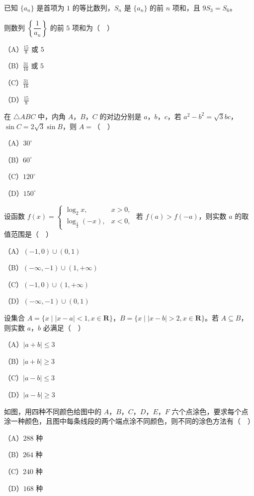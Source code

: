 \begin{question}
已知 $\{a_n\}$ 是首项为 $1$ 的等比数列，$S_n$ 是 $\{a_n\}$ 的前 $n$ 项和，且 $9S_3=S_6$。

则数列 $\left\{\dfrac1{a_n}\right\}$ 的前 $5$ 项和为（　）

（A）$\frac{15}8$ 或 $5$

（B）$\frac{31}{16}$ 或 $5$

（C）$\frac{31}{16}$

（D）$\frac{15}8$

\end{question}
\begin{question}
在 $\triangle ABC$ 中，内角 $A$，$B$，$C$ 的对边分别是 $a$，$b$，$c$，若 $a^2-b^2=\sqrt3bc$，$\sin C=2\sqrt3\sin B$，则 $A=$（　）

（A）$30^\circ$

（B）$60^\circ$

（C）$120^\circ$

（D）$150^\circ$

\end{question}
\begingroup
\renewenvironment{question}{\Needspace{0.5\textheight}}{}
\begin{question}
设函数 $f(x)=\begin{cases}\log_2x,&x>0,\\ \log_{\frac12}(-x),&x<0,\end{cases}$ 若 $f(a)>f(-a)$，则实数 $a$ 的取值范围是（　）

（A）$(-1,0)\cup(0,1)$

（B）$(-\infty,-1)\cup(1,+\infty)$

（C）$(-1,0)\cup(1,+\infty)$

（D）$(-\infty,-1)\cup(0,1)$

\end{question}
\endgroup
\begin{question}
设集合 $A=\{x\mid|x-a|<1,x\in\mathbf R\}$，$B=\{x\mid|x-b|>2,x\in\mathbf R\}$。若 $A\subseteq B$，则实数 $a$，$b$ 必满足（　）

（A）$|a+b|\leqslant3$

（B）$|a+b|\geqslant3$

（C）$|a-b|\leqslant3$

（D）$|a-b|\geqslant3$

\Needspace{0.4\textheight}
\end{question}
\begingroup
\renewenvironment{question}{\Needspace{0.5\textheight}}{}
\begin{question}
如图，用四种不同颜色给图中的 $A$，$B$，$C$，$D$，$E$，$F$ 六个点涂色，要求每个点涂一种颜色，且图中每条线段的两个端点涂不同颜色，则不同的涂色方法有（　）
\nopagebreak[4]
\begin{center}\end{center}
\nopagebreak[4]
（A）$288$ 种

（B）$264$ 种

（C）$240$ 种

（D）$168$ 种

\end{question}
\endgroup
{}

